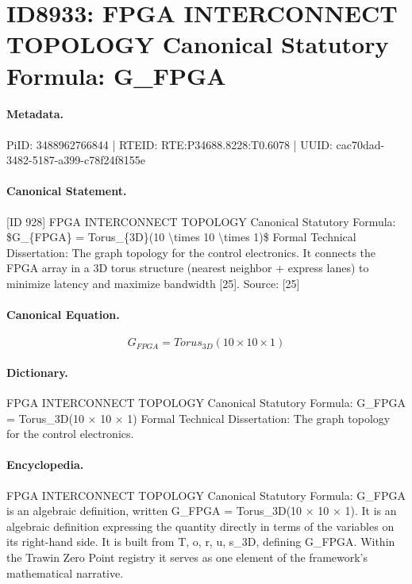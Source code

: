 \section*{ID8933: FPGA INTERCONNECT TOPOLOGY Canonical Statutory Formula: G\_FPGA}
\paragraph{Metadata.}
PiID: 3488962766844 | RTEID: RTE:P34688.8228:T0.6078 | UUID: cac70dad-3482-5187-a399-c78f24f8155e

\paragraph{Canonical Statement.}
[ID 928] FPGA INTERCONNECT TOPOLOGY Canonical Statutory Formula: \$G\_\{FPGA\} = Torus\_\{3D\}(10 \textbackslash{}times 10 \textbackslash{}times 1)\$ Formal Technical Dissertation: The graph topology for the control electronics. It connects the FPGA array in a 3D torus structure (nearest neighbor + express lanes) to minimize latency and maximize bandwidth [25]. Source: [25]

\paragraph{Canonical Equation.}
\[
G_{FPGA} = Torus_{3D}(10 \times 10 \times 1)
\]

\paragraph{Dictionary.}
FPGA INTERCONNECT TOPOLOGY Canonical Statutory Formula: G\_FPGA = Torus\_3D(10 × 10 × 1) Formal Technical Dissertation: The graph topology for the control electronics.

\paragraph{Encyclopedia.}
FPGA INTERCONNECT TOPOLOGY Canonical Statutory Formula: G\_FPGA is an algebraic definition, written G\_FPGA = Torus\_3D(10 × 10 × 1). It is an algebraic definition expressing the quantity directly in terms of the variables on its right-hand side. It is built from T, o, r, u, s\_3D, defining G\_FPGA. Within the Trawin Zero Point registry it serves as one element of the framework's mathematical narrative.
